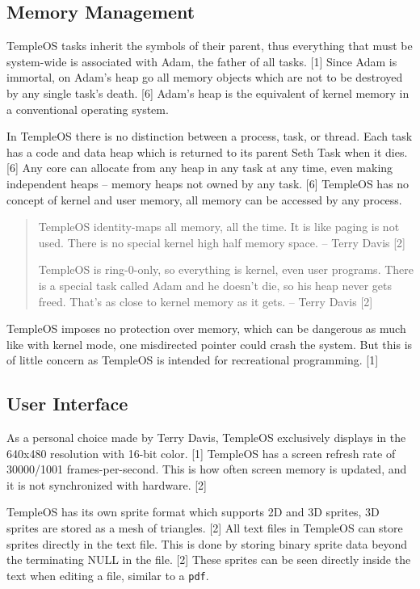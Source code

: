 \documentclass[11pt]{article}
\begin{document}
 \newpage

\subsection{Memory Management}
\label{sec:org1d7cb69}

TempleOS tasks inherit the symbols of their parent, thus everything that must be
system-wide is associated with Adam, the father of all tasks. [1] Since Adam is
immortal, on Adam's heap go all memory objects which are not to be destroyed by
any single task's death. [6] Adam's heap is the equivalent of kernel memory in a
conventional operating system.

In TempleOS there is no distinction between a process, task, or thread. Each
task has a code and data heap which is returned to its parent Seth Task when it
dies. [6] Any core can allocate from any heap in any task at any time, even
making independent heaps -- memory heaps not owned by any task. [6] TempleOS has
no concept of kernel and user memory, all memory can be accessed by any process.

\begin{quote}
TempleOS identity-maps all memory, all the time. It is like paging is not
used. There is no special kernel high half memory space. -- Terry Davis [2]

TempleOS is ring-0-only, so everything is kernel, even user programs. There is a
special task called Adam and he doesn't die, so his heap never gets
freed. That's as close to kernel memory as it gets. -- Terry Davis [2]
\end{quote}

TempleOS imposes no protection over memory, which can be dangerous as much like
with kernel mode, one misdirected pointer could crash the system. But this is of
little concern as TempleOS is intended for recreational programming. [1]

 \newpage

\subsection{User Interface}
\label{sec:org9e70c21}

As a personal choice made by Terry Davis, TempleOS exclusively displays in the
640x480 resolution with 16-bit color. [1] TempleOS has a screen refresh rate of
30000/1001 frames-per-second. This is how often screen memory is updated, and it
is not synchronized with hardware. [2]

TempleOS has its own sprite format which supports 2D and 3D sprites, 3D sprites
are stored as a mesh of triangles. [2] All text files in TempleOS can store
sprites directly in the text file. This is done by storing binary sprite data
beyond the terminating NULL in the file. [2] These sprites can be seen directly
inside the text when editing a file, similar to a \texttt{pdf}.
\end{document}
